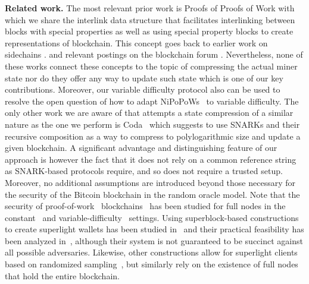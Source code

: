 \noindent
\textbf{Related work.}
The most relevant prior work is Proofs of Proofs of Work
\cite{popow,nipopows} with which we share the interlink
data structure that facilitates interlinking between blocks
with special properties as well as using special property blocks to
create representations of blockchain. This concept goes back
to earlier work on sidechains \cite{sidechains,pow-sidechains,pos-sidechains}.
and relevant postings on the blockchain forum
\cite{Miller:2012bn}. Nevertheless, none of these works connect
these concepts to the topic of compressing the actual miner state
nor do they offer any  way to update such state which is one of our key
contributions. Moreover, our variable difficulty protocol also can be used to resolve
the open question of how to adapt NiPoPoWs~\cite{nipopows} to variable difficulty. 
The only other work we are aware of that
attempts a state compression of a similar nature as the one we perform
is Coda~\cite{meckler2018coda}  which suggests to use SNARKs and their recursive composition
\cite{DBLP:conf/innovations/BitanskyCCT12,DBLP:conf/stoc/BitanskyCCT13} as a way to
compress to polylogarithmic size  and update a given blockchain.
A significant advantage and distinguishing feature of our approach is however the fact that it does
not rely on a common reference string as SNARK-based protocols
require, and so does not require a trusted setup. Moreover, no additional assumptions are introduced
beyond those necessary for the security of the Bitcoin blockchain
in the random oracle model.
Note that the security of proof-of-work~\cite{C:DwoNao92}
blockchains~\cite{bitcoin} has been studied for full nodes in the
constant~\cite{EC:GarKiaLeo15} and variable-difficulty~\cite{C:GarKiaLeo17}
settings.
Using superblock-based constructions to create superlight wallets has
been studied in~\cite{popow,nipopows} and their practical feasibility has been
analyzed in~\cite{gtklocker,compactsuperblocks}, although their system is not
guaranteed to be succinct against all possible adversaries.
Likewise, other constructions allow for superlight
clients based on randomized sampling~\cite{flyclient}, but similarly
rely on the existence of full nodes that hold
the entire blockchain.
